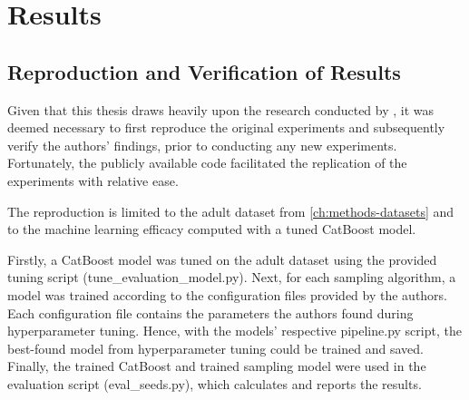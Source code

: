 \chapter{Results}
\label{ch:results}

\section{Reproduction and Verification of Results}
\label{ch:results-reproduction}

Given that this thesis draws heavily upon the research conducted by \cite{kotelnikov2022TabDDPMModellingTabular},
it was deemed necessary to first reproduce the original experiments and subsequently verify the authors' findings,
prior to conducting any new experiments.
Fortunately, the publicly available code \cite{akim2023TabDDPMModellingTabular} facilitated the replication of the experiments with relative ease.

The reproduction is limited to the adult dataset from \autoref{ch:methods-datasets} and to the machine learning efficacy computed with a tuned CatBoost \cite{prokhorenkova2018CatBoostUnbiasedBoosting} model.

Firstly, a CatBoost model was tuned on the adult dataset using the provided tuning script (tune\_evaluation\_model.py).
Next, for each sampling algorithm, a model was trained according to the configuration files provided by the authors.
Each configuration file contains the parameters the authors found during hyperparameter tuning.
Hence, with the models' respective pipeline.py script, the best-found model from hyperparameter tuning could be trained and saved.
Finally, the trained CatBoost and trained sampling model were used in the evaluation script (eval\_seeds.py), which calculates and reports the results.

